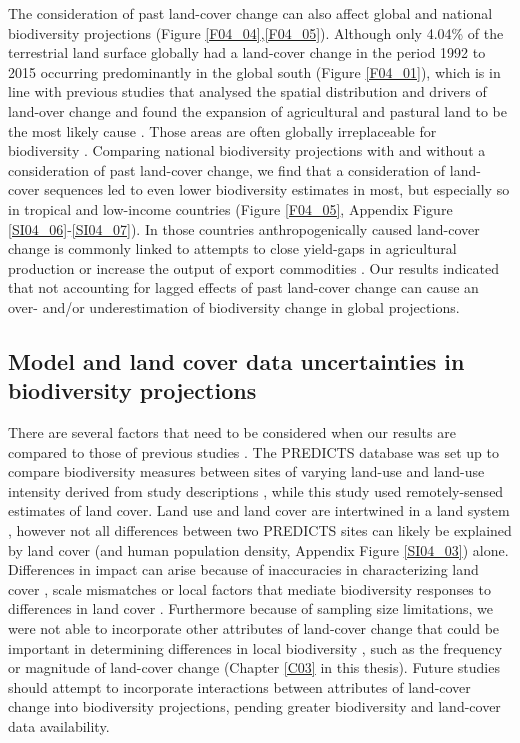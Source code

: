 The consideration of past land-cover change can also affect global and national biodiversity projections (Figure \ref{F04_04},\ref{F04_05}). Although only 4.04\% of the terrestrial land surface globally had a land-cover change in the period 1992 to 2015 occurring predominantly in the global south (Figure \ref{F04_01}), which is in line with previous studies that analysed the spatial distribution and drivers of land-over change \citep{Curtis2018,Nowosad2018} and found the expansion of agricultural and pastural land to be the most likely cause \citep{Phalan2013}. Those areas are often globally irreplaceable for biodiversity \citep{Brooks2002,Laurance2014,Pimm2014}. Comparing national biodiversity projections with and without a consideration of past land-cover change, we find that a consideration of land-cover sequences led to even lower biodiversity estimates in most, but especially so in tropical and low-income countries (Figure \ref{F04_05}, Appendix Figure \ref{SI04_06}-\ref{SI04_07}). In those countries anthropogenically caused land-cover change is commonly linked to attempts to close yield-gaps in agricultural production \citep{Mueller2012a} or increase the output of export commodities \citep{Byerlee2014,Meyfroidt2018}. Our results indicated that not accounting for lagged effects of past land-cover change can cause an over- and/or underestimation of biodiversity change in global projections.

\subsection{Model and land cover data uncertainties in biodiversity projections}
\label{C04_0402}

There are several factors that need to be considered when our results are compared to those of previous studies \citep{Newbold2015}. The PREDICTS database was set up to compare biodiversity measures between sites of varying land-use and land-use intensity derived from study descriptions \citep{Newbold2015,Hudson2016}, while this study used remotely-sensed estimates of land cover. Land use and land cover are intertwined in a land system \citep{Lambin2006,Turner2007}, however not all differences between two PREDICTS sites can likely be explained by land cover (and human population density, Appendix Figure \ref{SI04_03}) alone. Differences in impact can arise because of inaccuracies in characterizing land cover \citep{ESA2017}, scale mismatches \citep{Estes2018} or local factors that mediate biodiversity responses to differences in land cover \citep{Jung2016}. Furthermore because of sampling size limitations, we were not able to incorporate other attributes of land-cover change that could be important in determining differences in local biodiversity \citep{Watson2014}, such as the frequency \citep{Watson2014,Griffiths2015} or magnitude of land-cover change (Chapter \ref{C03} in this thesis). Future studies should attempt to incorporate interactions between attributes of land-cover change into biodiversity projections, pending greater biodiversity and land-cover data availability.

